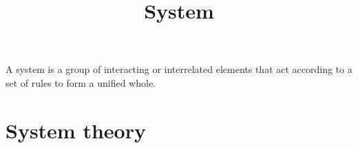 \documentclass[a4paper]{article}
\title{System}
\date{}
\begin{document}
\maketitle
    A system is a group of interacting or interrelated elements that act according to a set of rules to form a unified whole. 
    \section{System theory}
    
\end{document}
